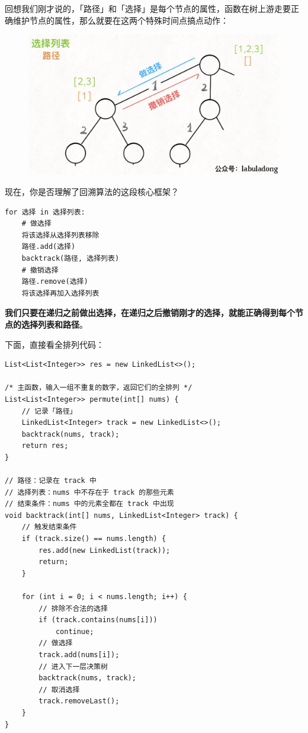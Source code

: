 \documentclass[12pt]{article}
\begin{document}
回想我们刚才说的，「路径」和「选择」是每个节点的属性，函数在树上游走要正确维护节点的属性，那么就要在这两个特殊时间点搞点动作：
\begin{figure}[H]
    \centering
    \includegraphics[width=.5\textwidth]{fig/Backtrack_5.png}
\end{figure}

现在，你是否理解了回溯算法的这段核心框架？
\begin{lstlisting}
for 选择 in 选择列表:
    # 做选择
    将该选择从选择列表移除
    路径.add(选择)
    backtrack(路径, 选择列表)
    # 撤销选择
    路径.remove(选择)
    将该选择再加入选择列表
\end{lstlisting}

\textbf{我们只要在递归之前做出选择，在递归之后撤销刚才的选择，就能正确得到每个节点的选择列表和路径}。


下面，直接看全排列代码：
\begin{lstlisting}
List<List<Integer>> res = new LinkedList<>();

/* 主函数，输入一组不重复的数字，返回它们的全排列 */
List<List<Integer>> permute(int[] nums) {
    // 记录「路径」
    LinkedList<Integer> track = new LinkedList<>();
    backtrack(nums, track);
    return res;
}

// 路径：记录在 track 中
// 选择列表：nums 中不存在于 track 的那些元素
// 结束条件：nums 中的元素全都在 track 中出现
void backtrack(int[] nums, LinkedList<Integer> track) {
    // 触发结束条件
    if (track.size() == nums.length) {
        res.add(new LinkedList(track));
        return;
    }
    
    for (int i = 0; i < nums.length; i++) {
        // 排除不合法的选择
        if (track.contains(nums[i]))
            continue;
        // 做选择
        track.add(nums[i]);
        // 进入下一层决策树
        backtrack(nums, track);
        // 取消选择
        track.removeLast();
    }
}
\end{lstlisting}
\end{document}
